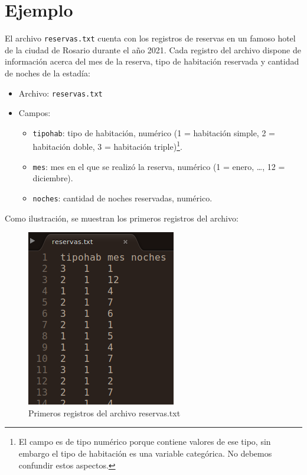 \documentclass[
]{book}
\providecommand{\tightlist}{%
  \setlength{\itemsep}{0pt}\setlength{\parskip}{0pt}}
\begin{document}
\hypertarget{ejemplo}{%
\section{Ejemplo}\label{ejemplo}}

El archivo \texttt{reservas.txt} cuenta con los registros de reservas en un famoso hotel de la ciudad de Rosario durante el año 2021. Cada registro del archivo dispone de información acerca del mes de la reserva, tipo de habitación reservada y cantidad de noches de la estadía:

\begin{itemize}
\item
  Archivo: \texttt{reservas.txt}
\item
  Campos:

  \begin{itemize}
  \tightlist
  \item
    \texttt{tipohab}: tipo de habitación, numérico (1 = habitación simple, 2 = habitación doble, 3 = habitación triple)\footnote{El campo es de tipo numérico porque contiene valores de ese tipo, sin embargo el tipo de habitación es una variable categórica. No debemos confundir estos aspectos.}.
  \item
    \texttt{mes}: mes en el que se realizó la reserva, numérico (1 = enero, \ldots, 12 = diciembre).
  \item
    \texttt{noches}: cantidad de noches reservadas, numérico.
  \end{itemize}
\end{itemize}

Como ilustración, se muestran los primeros registros del archivo:

\begin{figure}

{\centering \includegraphics[width=0.3\linewidth]{images/06_archivos/arch00} 

}

\caption{Primeros registros del archivo reservas.txt}\label{fig:unnamed-chunk-149}
\end{figure}
\end{document}
